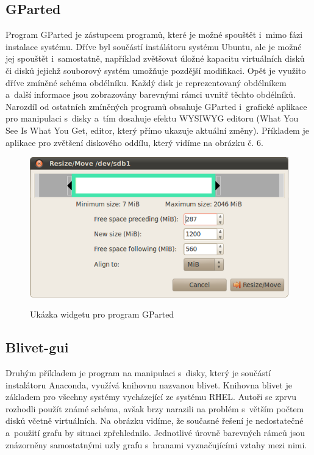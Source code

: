 \documentclass[a4paper]{article}
\begin{document}
\subsection{GParted}

Program GParted je zástupcem programů, které je možné spouštět i~mimo fázi instalace systému. Dříve byl součástí instálátoru systému Ubuntu, ale je možné jej spouštět i~samostatně, například 
 zvětšovat úložné kapacitu virtuálních disků či disků jejichž souborový systém umožňuje pozdější modifikaci. Opět je využito dříve zmíněné schéma obdélníku. Každý disk je reprezentovaný 
obdélníkem a~další informace jsou zobrazovány barevnými rámci uvnitř těchto obdélníků. Narozdíl od ostatních zmíněných programů obsahuje GParted i~grafické aplikace pro manipulaci s~disky 
a~tím dosahuje efektu WYSIWYG editoru (What You See Is What You Get, editor, který přímo ukazuje aktuální změny). Příkladem je aplikace pro zvětšení diskového oddílu, který vidíme na obrázku č. 6.

\begin{figure}[hb]
\label{fig:gparted}
\caption{Ukázka widgetu pro program GParted~\cite{GParted}}
\centering
\includegraphics[width=.8\columnwidth]{pics/gparted-5-big.png}\\
\end{figure}

\subsection{Blivet-gui\cite{blivet-gui}}

Druhým příkladem je program na manipulaci s~disky, který je součástí instalátoru Anaconda, využívá knihovnu nazvanou blivet. Knihovna blivet je základem pro všechny systémy vycházející ze systému RHEL. Autoři 
se zprvu rozhodli použít známé schéma, avšak brzy narazili na problém s~větším počtem disků včetně virtuálních. Na obrázku vidíme, že současné řešení je nedostatečné a~použití grafu by
situaci zpřehlednilo. Jednotlivé úrovně barevných rámců jsou znázorněny samostatnými uzly grafu s~hranami vyznačujícími vztahy mezi nimi. 
\printbibliography
\printindex
\end{document}
